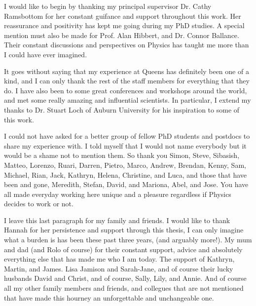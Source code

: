 I would like to begin by thanking my principal supervisor Dr. Cathy Ramsbottom for her constant guifance and support throughout this work. Her reassurance and positivity has kept me going during my PhD studies. A special mention must also be made for Prof. Alan Hibbert, and Dr. Connor Ballance. Their constant discussions and perspectives on Physics has taught me more than I could have ever imagined.

It goes without saying that my experience at Queens has definitely been one of a kind, and I can only thank the rest of the staff members for everything that they do. I have also been to some great conferences and workshops around the world, and met some really amazing and influential scientists. In particular, I extend my thanks to Dr. Stuart Loch of Auburn University for his inspiration to some of this work.

I could not have asked for a better group of fellow PhD students and postdocs to share my experience with. I told myself that I would not name everybody but it would be a shame not to mention them. So thank you Simon, Steve, Sibasish, Matteo, Lorenzo, Ruari, Darren, Pietro, Marco, Andrew, Brendan, Kenny, Sam, Michael, Rian, Jack, Kathryn, Helena, Christine, and Luca, and those that have been and gone, Meredith, Stefan, David, and Mariona, Abel, and Jose. You have all made everyday working here unique and a pleasure regardless if Physics decides to work or not.

I leave this last paragraph for my family and friends. I would like to thank Hannah for her persistence and support through this thesis, I can only imagine what a burden is has been these past three years, (and arguably more!). My mum and dad (and Rolo of course) for their constant support, advice and absolutely everything else that has made me who I am today. The support of Kathryn, Martin, and James. Lisa Jamison and Sarah-Jane, and of course their lucky husbands David and Christ, and of course, Sally, Lily, and Annie. And of course all my other family members and friends, and collegues that are not mentioned that have made this hourney an unforgettable and unchangeable one.
